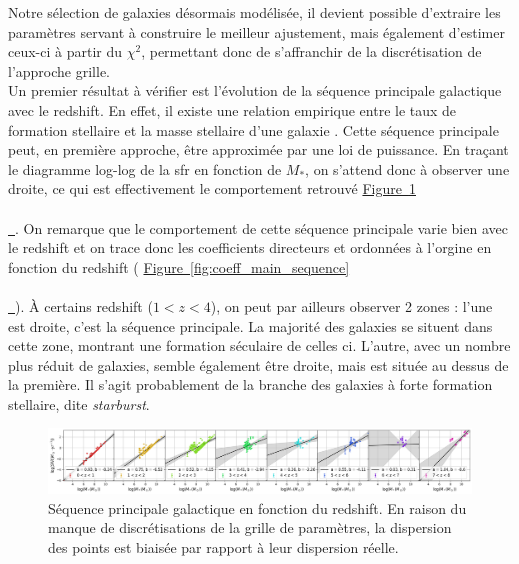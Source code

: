\documentclass[12pt, a4paper]{article}
\newcommand*{\figref}[2][]{%
  \hyperref[{#2}]{%
    Figure~\ref*{#2}%
    \ifx\\#1\\%
    \else
      \,#1%
    \fi
  }%
}
\begin{document}
Notre sélection de galaxies désormais modélisée, il devient possible d'extraire les paramètres servant à construire le meilleur ajustement, mais également d'estimer ceux-ci à partir du $\chi^2$, permettant donc de s'affranchir de la discrétisation de l'approche grille.\\

Un premier résultat à vérifier est l'évolution de la séquence principale galactique avec le redshift. En effet, il existe une relation empirique entre le taux de formation stellaire et la masse stellaire d'une galaxie \parencite{2007ApJ...660L..43N}. Cette séquence principale peut, en première approche, être approximée par une loi de puissance. En traçant le diagramme log-log de la \gls{sfr} en fonction de $M_*$, on s'attend donc à observer une droite, ce qui est effectivement le comportement retrouvé \figref{fig:main_sequence}. On remarque que le comportement de cette séquence principale varie bien avec le redshift \parencite{10.1093_mnras_stac3214} et on trace donc les coefficients directeurs et ordonnées à l'orgine en fonction du redshift (\figref{fig:coeff_main_sequence}). À certains redshift ($1<z<4$), on peut par ailleurs observer 2 zones : l'une est droite, c'est la séquence principale. La majorité des galaxies se situent dans cette zone, montrant une formation séculaire de celles ci. L'autre, avec un nombre plus réduit de galaxies, semble également être droite, mais est située au dessus de la première. Il s'agit probablement de la branche des galaxies à forte formation stellaire, dite \textit{starburst}.

\begin{figure}[!h]
  \centering
  \includegraphics[width=1\textwidth]{assets/main_sequence_redshift.png}
  \caption{Séquence principale galactique en fonction du redshift. En raison du manque de discrétisations de la grille de paramètres, la dispersion des points est biaisée par rapport à leur dispersion réelle.}
  \label{fig:main_sequence}
\end{figure}
\end{document}
